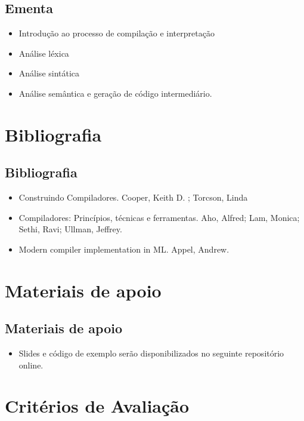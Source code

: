 \documentclass[11pt]{article}
\begin{document}
\subsection*{Ementa}
\label{sec:org3a5b173}

\begin{itemize}
\item Introdução ao processo de compilação e interpretação

\item Análise léxica

\item Análise sintática

\item Análise semântica e geração de código intermediário.
\end{itemize}
\section*{Bibliografia}
\label{sec:orgbefdec4}

\subsection*{Bibliografia}
\label{sec:org5e88e19}

\begin{itemize}
\item Construindo Compiladores. Cooper, Keith D. ; Torcson, Linda

\item Compiladores: Princípios, técnicas e ferramentas. Aho, Alfred; Lam,
Monica; Sethi, Ravi; Ullman, Jeffrey.

\item Modern compiler implementation in ML. Appel, Andrew.
\end{itemize}
\section*{Materiais de apoio}
\label{sec:org7fd9e1a}

\subsection*{Materiais de apoio}
\label{sec:orgfdeab99}

\begin{itemize}
\item Slides e código de exemplo serão disponibilizados no seguinte
repositório online.
\end{itemize}
\section*{Critérios de Avaliação}
\label{sec:org82c7bba}
\end{document}
